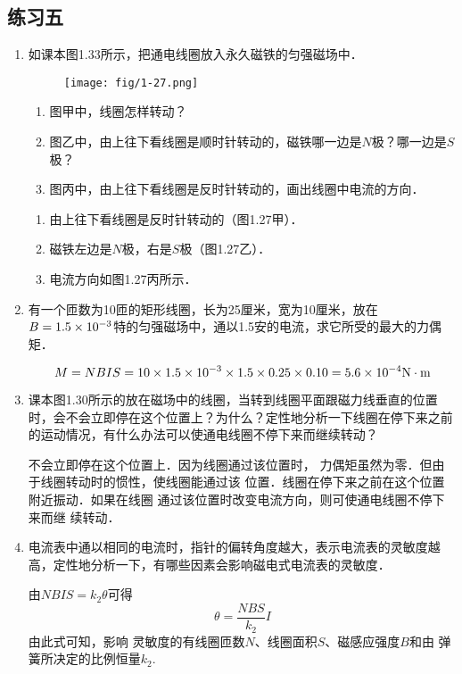 \subsection{练习五}
\begin{enumerate}
    \item 如课本图1.33所示，把通电线圈放入永久磁铁的匀强磁场中．
    \begin{figure}[htp]\centering
 	\texttt{[image: fig/1-27.png]}
    	\caption{ }
    \end{figure}
    \begin{enumerate}
        \item 图甲中，线圈怎样转动？
        \item 图乙中，由上往下看线圈是顺时针转动的，磁铁哪一边是$N$极？哪一边是$S$极？
        \item 图丙中，由上往下看线圈是反时针转动的，画出线圈中电流的方向．
    \end{enumerate}


    \begin{solution}
\begin{enumerate}
    \item 由上往下看线圈是反时针转动的（图1.27甲）．
    \item 磁铁左边是$N$极，右是$S$极（图1.27乙）．
    \item 电流方向如图1.27丙所示．
\end{enumerate}
    \end{solution}
    
    \item 有一个匝数为10匝的矩形线圈，长为25厘米，宽为10厘米，放在$B=1.5\times10^{-3}$特的匀强磁场中，通以1.5安的电流，求它所受的最大的力偶矩．


    \begin{solution}
\[M=NBIS=10\times1.5\times10^{-3}\times1.5\times0.25\times0.10
=5.6\times10^{-4}{\rm N\cdot m}\]
    \end{solution}
    
    \item 课本图1.30所示的放在磁场中的线圈，当转到线圈平面跟磁力线垂直的位置时，会不会立即停在这个位置上？为什么？定性地分析一下线圈在停下来之前的运动情况，有什么办法可以使通电线圈不停下来而继续转动？


    \begin{solution}
    不会立即停在这个位置上．因为线圈通过该位置时，
力偶矩虽然为零．但由于线圈转动时的惯性，使线圈能通过该
位置．线圈在停下来之前在这个位置附近振动．如果在线圈
通过该位置时改变电流方向，则可使通电线圈不停下来而继
续转动．
    \end{solution}
    
    \item 电流表中通以相同的电流时，指针的偏转角度越大，表示电流表的灵敏度越高，定性地分析一下，有哪些因素会影响磁电式电流表的灵敏度．


    \begin{solution}
        由$NBIS=k_2\theta$可得$$\theta=\dfrac{NBS}{k_2}I$$
        由此式可知，影响
        灵敏度的有线圈匝数$N$、线圈面积$S$、磁感应强度$B$和由
        弹簧所决定的比例恒量$k_2$.
    \end{solution}
    
\end{enumerate}


